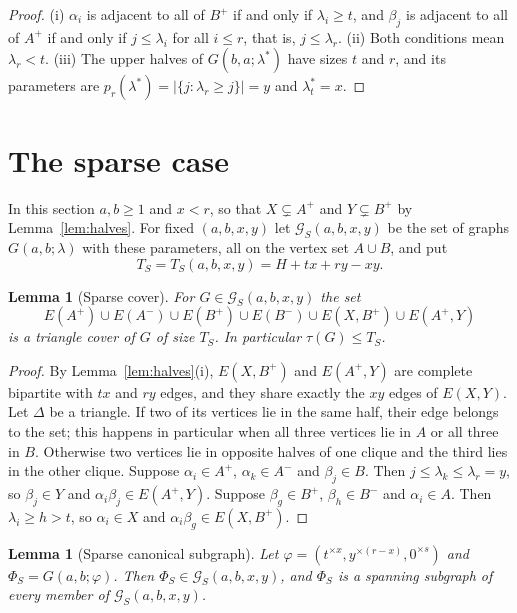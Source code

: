\documentclass{amsart}
\newtheorem{lemma}[theorem]{Lemma}
\theoremstyle{definition}
\numberwithin{equation}{section}
\numberwithin{table}{section}
\newcommand{\rep}[2]{#1^{\times #2}}
\begin{document}
\begin{proof}
(i) $\alpha_i$ is adjacent to all of $B^+$ if and only if $\lambda_i\ge t$, and $\beta_j$ is adjacent to all of $A^+$ if and only if $j\le\lambda_i$ for all $i\le r$, that is, $j\le\lambda_r$. (ii) Both conditions mean $\lambda_r<t$. (iii) The upper halves of $G(b,a;\lambda^*)$ have sizes $t$ and $r$, and its parameters are $p_r(\lambda^*)=|\{j:\lambda_r\ge j\}|=y$ and $\lambda^*_t=x$.
\end{proof}

\section{The sparse case}\label{sec:sparse}

In this section $a,b\ge 1$ and $x<r$, so that $X\subsetneq A^+$ and $Y\subsetneq B^+$ by Lemma~\ref{lem:halves}. For fixed $(a,b,x,y)$ let $\mathcal G_S(a,b,x,y)$ be the set of graphs $G(a,b;\lambda)$ with these parameters, all on the vertex set $A\cup B$, and put
\[
T_S=T_S(a,b,x,y)=H+tx+ry-xy.
\]

\begin{lemma}[Sparse cover]\label{lem:sparse-cover}
For $G\in\mathcal G_S(a,b,x,y)$ the set
\[
E(A^+)\cup E(A^-)\cup E(B^+)\cup E(B^-)\cup E(X,B^+)\cup E(A^+,Y)
\]
is a triangle cover of $G$ of size $T_S$. In particular $\tau(G)\le T_S$.
\end{lemma}

\begin{proof}
By Lemma~\ref{lem:halves}(i), $E(X,B^+)$ and $E(A^+,Y)$ are complete bipartite with $tx$ and $ry$ edges, and they share exactly the $xy$ edges of $E(X,Y)$. Let $\Delta$ be a triangle. If two of its vertices lie in the same half, their edge belongs to the set; this happens in particular when all three vertices lie in $A$ or all three in $B$. Otherwise two vertices lie in opposite halves of one clique and the third lies in the other clique. Suppose $\alpha_i\in A^+$, $\alpha_k\in A^-$ and $\beta_j\in B$. Then $j\le\lambda_k\le\lambda_r=y$, so $\beta_j\in Y$ and $\alpha_i\beta_j\in E(A^+,Y)$. Suppose $\beta_g\in B^+$, $\beta_h\in B^-$ and $\alpha_i\in A$. Then $\lambda_i\ge h>t$, so $\alpha_i\in X$ and $\alpha_i\beta_g\in E(X,B^+)$.
\end{proof}

\begin{lemma}[Sparse canonical subgraph]\label{lem:sparse-canonical}
Let $\varphi=(\rep{t}{x},\rep{y}{(r-x)},\rep{0}{s})$ and $\Phi_S=G(a,b;\varphi)$. Then $\Phi_S\in\mathcal G_S(a,b,x,y)$, and $\Phi_S$ is a spanning subgraph of every member of $\mathcal G_S(a,b,x,y)$.
\end{lemma}
\end{document}
